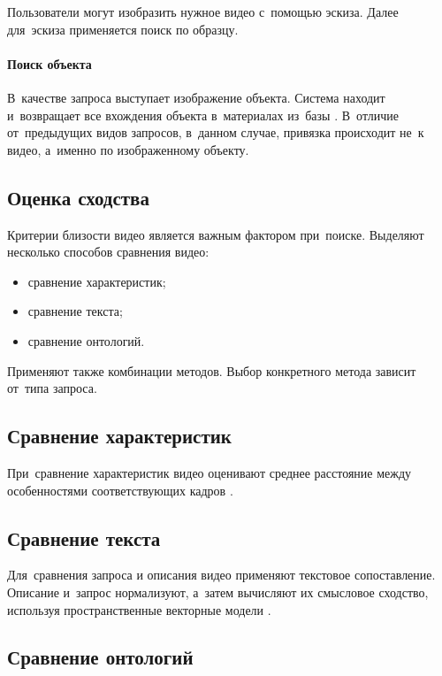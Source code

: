 Пользователи могут изобразить нужное видео с~помощью эскиза.
Далее для~эскиза применяется поиск по образцу.

\paragraph{Поиск объекта}

В~качестве запроса выступает изображение объекта.
Система находит и~возвращает все вхождения объекта
в~материалах из~базы \cite{Sivic:2006}.
В~отличие от~предыдущих видов запросов,
в~данном случае, привязка происходит не~к видео,
а~именно по изображенному объекту.


\subsection{Оценка сходства}


Критерии близости видео является важным фактором при~поиске.
Выделяют несколько способов сравнения видео:
\begin{itemize}
    \item сравнение характеристик;
    \item сравнение текста;
    \item сравнение онтологий.
\end{itemize}

Применяют также комбинации методов.
Выбор конкретного метода зависит от~типа запроса.

\subsection{Сравнение характеристик}

При~сравнение характеристик видео оценивают среднее расстояние между
особенностями соответствующих кадров \cite{Browne:2005}.

\subsection{Сравнение текста}

Для~сравнения запроса и описания видео
применяют текстовое сопоставление.
Описание и~запрос нормализуют,
а~затем вычисляют их смысловое сходство,
используя пространственные векторные модели \cite{Snoek:2007}.

\subsection{Сравнение онтологий}

